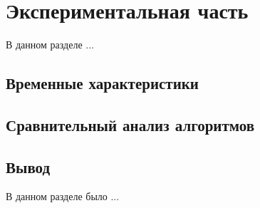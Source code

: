 \chapter{Экспериментальная часть}

В данном разделе ...

\section{Временные характеристики}

\section{Сравнительный анализ алгоритмов}

\section{Вывод}

В данном разделе было ...
